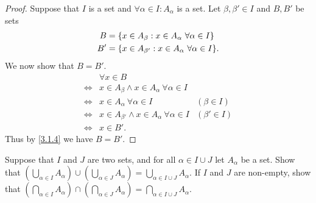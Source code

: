 \begin{proof}
  Suppose that \(I\) is a set and \(\forall \alpha \in I : A_{\alpha}\) is a set.
  Let \(\beta, \beta' \in I\) and \(B, B'\) be sets
  \begin{align*}
    B  & = \set{x \in A_{\beta} : x \in A_{\alpha} \ \forall \alpha \in I}   \\
    B' & = \set{x \in A_{\beta'} : x \in A_{\alpha} \ \forall \alpha \in I}.
  \end{align*}
  We now show that \(B = B'\).
  \begin{align*}
         & \forall x \in B                                                                 \\
    \iff & x \in A_{\beta} \land x \in A_{\alpha} \ \forall \alpha \in I                   \\
    \iff & x \in A_{\alpha} \ \forall \alpha \in I                        & (\beta \in I)  \\
    \iff & x \in A_{\beta'} \land x \in A_{\alpha} \ \forall \alpha \in I & (\beta' \in I) \\
    \iff & x \in B'.
  \end{align*}
  Thus by \cref{3.1.4} we have \(B = B'\).
\end{proof}

\begin{ex}\label{ex:3.4.10}
  Suppose that \(I\) and \(J\) are two sets, and for all \(\alpha \in I \cup J\) let \(A_{\alpha}\) be a set.
  Show that \((\bigcup_{\alpha \in I} A_{\alpha}) \cup (\bigcup_{\alpha \in J} A_{\alpha}) = \bigcup_{\alpha \in I \cup J} A_{\alpha}\).
  If \(I\) and \(J\) are non-empty, show that \((\bigcap_{\alpha \in I} A_{\alpha}) \cap (\bigcap_{\alpha \in J} A_{\alpha}) = \bigcap_{\alpha \in I \cup J} A_{\alpha}\).
\end{ex}

